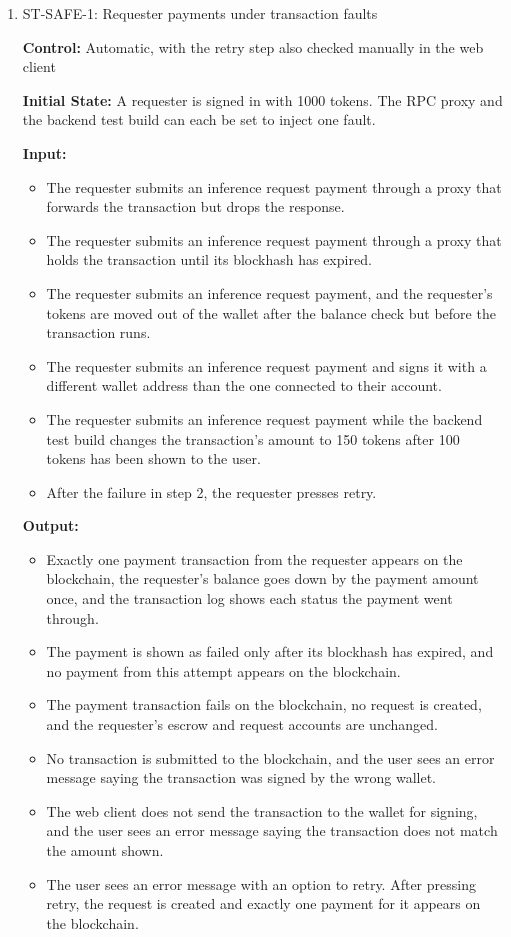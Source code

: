 \documentclass[12pt]{article}
\begin{document}
\begin{enumerate}

\item{ST-SAFE-1: Requester payments under transaction faults\\}

\textbf{Control:} Automatic, with the retry step also checked manually in the web client

\textbf{Initial State:} A requester is signed in with 1000 tokens. The RPC proxy and
the backend test build can each be set to inject one fault.

\textbf{Input:}
\begin{itemize}
\item[1.] The requester submits an inference request payment through a proxy
that forwards the transaction but drops the response.
\item[2.] The requester submits an inference request payment through a proxy
that holds the transaction until its blockhash has expired.
\item[3.] The requester submits an inference request payment, and the
requester's tokens are moved out of the wallet after the balance check but
before the transaction runs.
\item[4.] The requester submits an inference request payment and signs it with
a different wallet address than the one connected to their account.
\item[5.] The requester submits an inference request payment while the backend
test build changes the transaction's amount to 150 tokens after 100 tokens has
been shown to the user.
\item[6.] After the failure in step 2, the requester presses retry.
\end{itemize}

\textbf{Output:}
\begin{itemize}
\item[1.] Exactly one payment transaction from the requester appears on the
blockchain, the requester's balance goes down by the payment amount once, and
the transaction log shows each status the payment went through.
\item[2.] The payment is shown as failed only after its blockhash has expired,
and no payment from this attempt appears on the blockchain.
\item[3.] The payment transaction fails on the blockchain, no request is
created, and the requester's escrow and request accounts are unchanged.
\item[4.] No transaction is submitted to the blockchain, and the user sees an
error message saying the transaction was signed by the wrong wallet.
\item[5.] The web client does not send the transaction to the wallet for
signing, and the user sees an error message saying the transaction does not
match the amount shown.
\item[6.] The user sees an error message with an option to retry. After pressing
retry, the request is created and exactly one payment for it appears on the
blockchain.
\end{itemize}


\end{enumerate}
\end{document}

